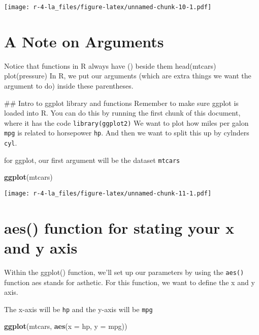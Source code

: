 \documentclass[
]{book}
\newenvironment{Shaded}{\begin{snugshade}}{\end{snugshade}}
\newcommand{\DataTypeTok}[1]{\textcolor[rgb]{0.13,0.29,0.53}{#1}}
\newcommand{\KeywordTok}[1]{\textcolor[rgb]{0.13,0.29,0.53}{\textbf{#1}}}
\newcommand{\NormalTok}[1]{#1}
\begin{document}
\texttt{[image: r-4-la\_files/figure-latex/unnamed-chunk-10-1.pdf]}

\hypertarget{a-note-on-arguments}{%
\section{A Note on Arguments}\label{a-note-on-arguments}}

Notice that functions in R always have () beside them
head(mtcars)
plot(pressure)
In R, we put our arguments (which are extra things we want the argument to do)
inside these parentheses.

\#\# Intro to ggplot library and functions
Remember to make sure ggplot is loaded into R.
You can do this by running the first chunk of this document, where it has the
code \texttt{library(ggplot2)}
We want to plot how miles per galon \texttt{mpg} is related to horsepower \texttt{hp}.
And then we want to split this up by cylnders \texttt{cyl}.

for ggplot, our first argument will be the dataset \texttt{mtcars}

\begin{Shaded}
\begin{Highlighting}[]
\KeywordTok{ggplot}\NormalTok{(mtcars)}
\end{Highlighting}
\end{Shaded}

\texttt{[image: r-4-la\_files/figure-latex/unnamed-chunk-11-1.pdf]}

\hypertarget{aes-function-for-stating-your-x-and-y-axis}{%
\section{aes() function for stating your x and y axis}\label{aes-function-for-stating-your-x-and-y-axis}}

Within the ggplot() function, we'll set up our parameters by using the \texttt{aes()} function
aes stands for asthetic. For this function, we want to define the x and y axis.

The x-axis will be \texttt{hp} and the y-axis will be \texttt{mpg}

\begin{Shaded}
\begin{Highlighting}[]
\KeywordTok{ggplot}\NormalTok{(mtcars, }\KeywordTok{aes}\NormalTok{(}\DataTypeTok{x =}\NormalTok{ hp, }\DataTypeTok{y =}\NormalTok{ mpg))}
\end{Highlighting}
\end{Shaded}
\end{document}
